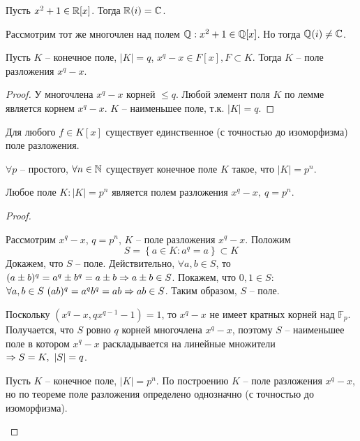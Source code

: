 \begin{Example}
	Пусть $x^2 + 1 \in \mathbb{R}[x]$. Тогда $\mathbb{R}(i) = \mathbb{C}$. 
\end{Example}

\begin{Example}
	Рассмотрим тот же многочлен над полем $\mathbb{Q} : x^2 + 1 \in \mathbb{Q}[x]$. Но тогда $\mathbb{Q}(i) \neq \mathbb{C}$.
\end{Example}

\begin{Lm}
	Пусть $K$ -- конечное поле, $|K| = q$, $x^q - x \in F[x], F \subset K$.
	Тогда $K$ -- поле разложения $x^q - x$.
\end{Lm}

\begin{proof}
	У многочлена $x^q - x$ корней $\leqslant q$. Любой элемент поля $K$ по лемме является корнем $x^q - x$.
	$K$ -- наименьшее поле, т.к. $|K| = q$.  
\end{proof}

\begin{Thm}
	Для любого $f \in K[x]$ существует единственное (с точностью до изоморфизма) поле разложения. 
\end{Thm}

\begin{Thm}
	\begin{MyList}
		\item $\forall p$ -- простого, $\forall n \in \mathbb{N}$ существует конечное поле $K$ такое, что $|K| = p^n$.
		\item Любое поле $K : |K| = p^n$ является полем разложения $x^q - x, \ q = p^n$.
	\end{MyList}  
\end{Thm}

\begin{proof}
	\begin{MyList}
		\item Рассмотрим $x^q - x$, $q = p^n$, $K$ -- поле разложения $x^q - x$. Положим
		\[S = \left\{a \in K : a^q = a\right\} \subset K\]
		Докажем, что $S$ -- поле. Действительно, $\forall a, b \in S$, то $(a \pm b)^q = a^q \pm b^q = a \pm b \Rightarrow a \pm b \in S$.
		Покажем, что $0, 1 \in S$: $\forall a, b \in S \ (ab)^q = a^q b^q = ab \Rightarrow ab \in S$.   
		Таким образом, $S$ -- поле.

		Поскольку $(x^q - x, qx^{q - 1} - 1) = 1$, то $x^q - x$ не имеет кратных корней над $\mathbb{F}_p$.
		Получается, что $S$ ровно $q$ корней многочлена $x^q - x$, поэтому $S$ -- наименьшее поле в котором $x^q - x$ раскладывается на линейные множители $\Rightarrow S = K, \ |S| = q$.

		\item Пусть $K$ -- конечное поле, $|K| = p^n$. По построению $K$ -- поле разложения $x^q - x$, но по теореме поле разложения определено однозначно (с точностью до изоморфизма).
	\end{MyList}
\end{proof}

